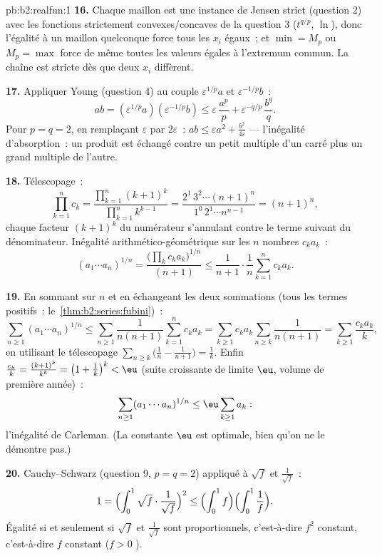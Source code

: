 \begin{solution}{pb:b2:realfun:1}
\textbf{16.} Chaque maillon est une instance de Jensen strict
(question 2) avec les fonctions strictement convexes/concaves de la
question 3 ($t^{q/p}$, $\ln$), donc l'égalité à un maillon quelconque
force tous les $x_i$ égaux~; et $\min = M_p$ ou $M_p = \max$ force de
même toutes les valeurs égales à l'extremum commun. La chaîne est
stricte dès que deux $x_i$ diffèrent.

\textbf{17.} Appliquer Young (question 4) au couple
$\varepsilon^{1/p}a$ et $\varepsilon^{-1/p}b$~:
\[
ab = (\varepsilon^{1/p}a)(\varepsilon^{-1/p}b)
\leq \varepsilon\,\frac{a^p}p +
\varepsilon^{-q/p}\,\frac{b^q}q .
\]
Pour $p = q = 2$, en remplaçant $\varepsilon$ par $2\varepsilon$~:
$ab \leq \varepsilon a^2 + \frac{b^2}{4\varepsilon}$ --- l'inégalité
d'absorption~: un produit est échangé contre un petit multiple d'un
carré plus un grand multiple de l'autre.

\textbf{18.} Télescopage~:
\[
\prod_{k=1}^{n}c_k = \frac{\prod_{k=1}^n(k+1)^k}
{\prod_{k=1}^{n}k^{k-1}}
= \frac{2^1\,3^2\cdots(n+1)^n}{1^0\,2^1\cdots n^{n-1}}
= (n+1)^n,
\]
chaque facteur $(k+1)^k$ du numérateur s'annulant contre le terme
suivant du dénominateur. Inégalité arithmético-géométrique sur les
$n$ nombres $c_ka_k$~:
\[
(a_1\cdots a_n)^{1/n} =
\frac{\bigl(\prod_k c_ka_k\bigr)^{1/n}}{(n+1)}
\leq \frac{1}{n+1}\cdot\frac1n\sum_{k=1}^{n}c_ka_k .
\]

\textbf{19.} En sommant sur $n$ et en échangeant les deux sommations
(tous les termes positifs~: le~\cref{thm:b2:series:fubini})~:
\[
\sum_{n\geq1}(a_1\cdots a_n)^{1/n}
\leq \sum_{n\geq1}\frac{1}{n(n+1)}\sum_{k=1}^{n}c_ka_k
= \sum_{k\geq1}c_ka_k\sum_{n\geq k}\frac1{n(n+1)}
= \sum_{k\geq1}\frac{c_ka_k}{k},
\]
en utilisant le télescopage $\sum_{n\geq k}\bigl(\frac1n -
\frac1{n+1}\bigr) = \frac1k$. Enfin $\frac{c_k}k =
\frac{(k+1)^k}{k^k} = \bigl(1 + \frac1k\bigr)^k < \eu$
(suite croissante de limite $\eu$, volume de première année)~:
\[
\sum_{n\geq1}(a_1\cdots a_n)^{1/n} \leq
\eu\sum_{k\geq1}a_k :
\]
l'inégalité de Carleman. (La constante $\eu$ est optimale, bien
qu'on ne le démontre pas.)

\textbf{20.} Cauchy--Schwarz (question 9, $p = q = 2$) appliqué
à $\sqrt f$ et $\frac1{\sqrt f}$~:
\[
1 = \Bigl(\int_0^1\sqrt f\cdot\frac{1}{\sqrt f}\Bigr)^{2}
\leq \Bigl(\int_0^1 f\Bigr)\Bigl(\int_0^1\frac1f\Bigr).
\]
Égalité si et seulement si $\sqrt f$ et $\frac1{\sqrt f}$ sont
proportionnels, c'est-à-dire $f^2$ constant, c'est-à-dire $f$
constant ($f > 0$ ).


\end{solution}
